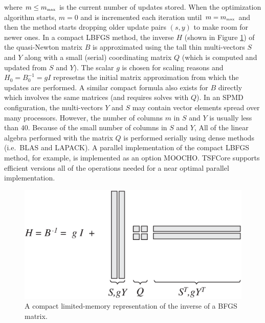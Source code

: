 \documentclass[10pt,fleqn]{article}
\begin{document}
where $m \le m_{\tiny\mbox{max}}$ is the current number of updates
stored.  When the optimization algorithm starts, $m=0$ and is
incremented each iteration until $m = m_{\tiny\mbox{max}}$ and then
the method starts dropping older update pairs $(s,y)$ to make room for
newer ones.  In a compact LBFGS method, the inverse $H$ (shown in
Figure \ref{tsfcore:fig:LBFGS}) of the quasi-Newton matrix $B$ is
approximated using the tall thin multi-vectors $S$ and $Y$ along with
a small (serial) coordinating matrix $Q$ (which is computed and
updated from $S$ and $Y$).  The scalar $g$ is chosen for scaling
reasons and $H_0 = B_0^{-1} = g I$ represetns the initial matrix
approximation from which the updates are performed.  A similar compact
formula also exists for $B$ directly which involves the same matrices
(and requires solves with $Q$).  In an SPMD configuration, the
multi-vectors $Y$ and $S$ may contain vector elements spread over many
processors.  However, the number of columns $m$ in $S$ and $Y$ is
usually less than $40$.  Because of the small number of columns in $S$
and $Y$, All of the linear algebra performed with the matrix $Q$ is
performed serially using dense methods (i.e.~BLAS and LAPACK).  A
parallel implementation of the compact LBFGS method, for example, is
implemented as an option MOOCHO.  TSFCore supports efficient versions all
of the operations needed for a near optimal parallel implementation.

{\bsinglespace
\begin{figure}[t]
\begin{center}
\includegraphics*[bb= 0.0in 0.0in 7.0in 3.7in,angle=0,scale=0.60
]{LBFGS}
\end{center}
\caption{
\label{tsfcore:fig:LBFGS}
A compact limited-memory representation of the inverse of a BFGS matrix.
}
\end{figure}
\esinglespace}
\end{document}
